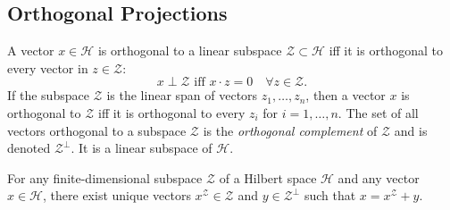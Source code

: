 \documentclass[\topdir/lecture\_notes.tex]{subfiles}
\begin{document}
\subsection{Orthogonal Projections}
A vector \(x \in \mathcal{H}\) is orthogonal to a linear subspace \(\mathcal{Z} \subset \mathcal{H}\) iff it is orthogonal to every vector in \(z \in \mathcal{Z}\):
\begin{equation*}
x \perp \mathcal{Z} \text { iff } x \cdot z=0 \quad \forall z \in \mathcal{Z}. 
\end{equation*}
If the subspace \(\mathcal{Z}\) is the linear span of vectors \(z_{1}, \ldots, z_{n}\), then a vector \(x\) is orthogonal to \(\mathcal{Z}\) iff it is orthogonal to every \(z_{i}\) for \(i=1, \ldots, n\). The set of all vectors orthogonal to a subspace \(\mathcal{Z}\) is the \emph{orthogonal complement} of \(\mathcal{Z}\) and is denoted \(\mathcal{Z}^{\perp}\). It is a linear subspace of \(\mathcal{H}\).
\begin{theorem}\label{thm:orthogonal_projection}
For any finite-dimensional subspace \(\mathcal{Z}\) of a Hilbert space \(\mathcal{H}\) and any vector \(x \in \mathcal{H}\), there exist unique vectors \(x^{\mathcal{Z}} \in \mathcal{Z}\) and \(y \in \mathcal{Z}^{\perp}\) such that \(x=x^{\mathcal{Z}}+y\).
\end{theorem}
\end{document}
